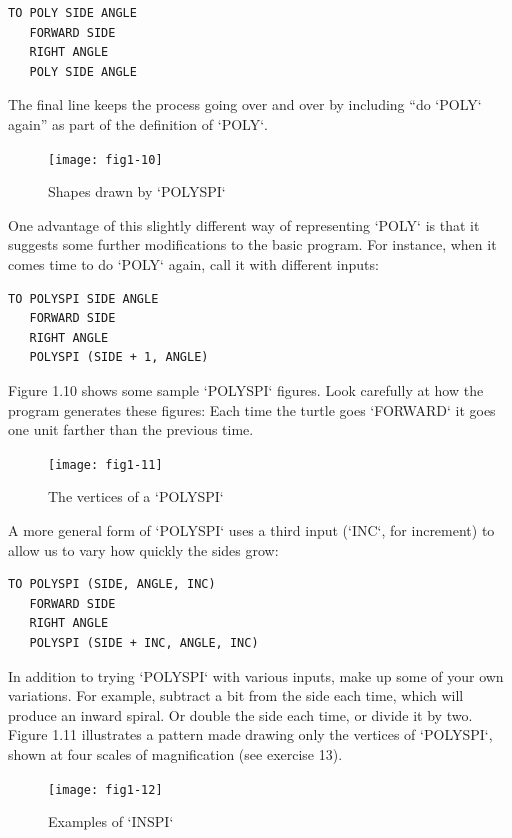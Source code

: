 \documentclass{book}
\begin{document}
\begin{verbatim}
TO POLY SIDE ANGLE
   FORWARD SIDE
   RIGHT ANGLE
   POLY SIDE ANGLE
\end{verbatim}
The final line keeps the process going over and over by including ``do \textsc{`POLY`} again'' as part of the definition of \textsc{`POLY`}.

\begin{figure}
\begin{center}
\texttt{[image: fig1-10]}
\caption{Shapes drawn by \textsc{`POLYSPI`}}
\end{center}
\end{figure}

One advantage of this slightly different way of representing \textsc{`POLY`} is
that it suggests some further modifications to the basic program. For
instance, when it comes time to do \textsc{`POLY`} again, call it with different
inputs: 

\begin{verbatim}
TO POLYSPI SIDE ANGLE
   FORWARD SIDE
   RIGHT ANGLE
   POLYSPI (SIDE + 1, ANGLE)
\end{verbatim}
Figure 1.10 shows some sample \textsc{`POLYSPI`} figures. Look carefully at how
the program generates these figures: Each time the turtle goes \textsc{`FORWARD`}
it goes one unit farther than the previous time.

\begin{figure}
\begin{center}
\texttt{[image: fig1-11]}
\caption{The vertices of a \textsc{`POLYSPI`}}
\end{center}
\end{figure}

A more general form of \textsc{`POLYSPI`} uses a third input (\textsc{`INC`}, for increment)
to allow us to vary how quickly the sides grow:

\begin{verbatim}
TO POLYSPI (SIDE, ANGLE, INC)
   FORWARD SIDE
   RIGHT ANGLE
   POLYSPI (SIDE + INC, ANGLE, INC)
\end{verbatim}
In addition to trying \textsc{`POLYSPI`} with various inputs, make up some of your
own variations. For example, subtract a bit from the side each time,
which will produce an inward spiral. Or double the side each time, or
divide it by two. Figure 1.11 illustrates a pattern made drawing only the
vertices of \textsc{`POLYSPI`}, shown at four scales of magnification (see 
exercise 13).  

\begin{figure}
\begin{center}
\texttt{[image: fig1-12]}
\caption{Examples of \textsc{`INSPI`}}
\end{center}
\end{figure}
\end{document}
